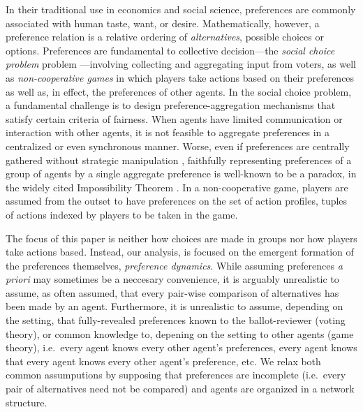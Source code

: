 \documentclass[conference]{ieeeconf}
\begin{document}
In their traditional use in economics and social science, preferences are commonly associated with human taste, want, or desire. Mathematically, however, a preference relation is a relative ordering of \emph{alternatives}, possible choices or options. Preferences are fundamental to collective decision---the \emph{social choice problem} problem \cite{munger2015}---involving collecting and aggregating input from voters, as well as \emph{non-cooperative games} \cite{osborne1994} in which players take actions based on their preferences as well as, in effect, the preferences of other agents. In the social choice problem, a fundamental challenge is to design preference-aggregation mechanisms that satisfy certain criteria of fairness. When agents have limited communication or interaction with other agents, it is not feasible to aggregate preferences in a centralized or even synchronous manner. Worse, even if preferences are centrally gathered without strategic manipulation \cite{gibbard1973,satterthwaite1975}, faithfully representing preferences of a group of agents by a single aggregate preference is well-known to be a paradox, in the widely cited Impossibility Theorem \cite{arrow2012}. In a non-cooperative game, players are assumed from the outset to have preferences on the set of action profiles, tuples of actions indexed by players to be taken in the game. 

The focus of this paper is neither how choices are made in groups nor how players take actions based. Instead, our analysis, is focused on the emergent formation of the preferences themselves, \emph{preference dynamics}. While assuming preferences \emph{a priori} may sometimes be a neccesary convenience, it is arguably unrealistic to assume, as often assumed, that every pair-wise comparison of alternatives has been made by an agent. Furthermore, it is unrealistic to assume, depending on the setting, that fully-revealed preferences known to the ballot-reviewer (voting theory), or common knowledge to, depening on the setting to other agents (game theory), i.e.~every agent knows every other agent's preferences, every agent knows that every agent knows every other agent's preference, etc. We relax both common assumputions by supposing that preferences are incomplete (i.e.~every pair of alternatives need not be compared) and agents are organized in a network structure.
\end{document}
